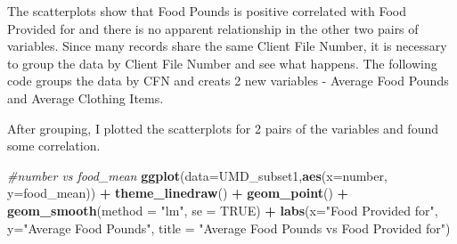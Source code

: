 \documentclass[]{article}
\newenvironment{Shaded}{\begin{snugshade}}{\end{snugshade}}
\newcommand{\CommentTok}[1]{\textcolor[rgb]{0.56,0.35,0.01}{\textit{#1}}}
\newcommand{\DataTypeTok}[1]{\textcolor[rgb]{0.13,0.29,0.53}{#1}}
\newcommand{\KeywordTok}[1]{\textcolor[rgb]{0.13,0.29,0.53}{\textbf{#1}}}
\newcommand{\NormalTok}[1]{#1}
\newcommand{\OperatorTok}[1]{\textcolor[rgb]{0.81,0.36,0.00}{\textbf{#1}}}
\newcommand{\OtherTok}[1]{\textcolor[rgb]{0.56,0.35,0.01}{#1}}
\newcommand{\StringTok}[1]{\textcolor[rgb]{0.31,0.60,0.02}{#1}}
\begin{document}
The scatterplots show that Food Pounds is positive correlated with Food
Provided for and there is no apparent relationship in the other two
pairs of variables. Since many records share the same Client File
Number, it is necessary to group the data by Client File Number and see
what happens. The following code groups the data by CFN and creats 2 new
variables - Average Food Pounds and Average Clothing Items.

\begin{Shaded}
\end{Shaded}

After grouping, I plotted the scatterplots for 2 pairs of the variables
and found some correlation.

\begin{Shaded}
\begin{Highlighting}[]
\CommentTok{#number vs food_mean}
\KeywordTok{ggplot}\NormalTok{(}\DataTypeTok{data=}\NormalTok{UMD_subset1,}\KeywordTok{aes}\NormalTok{(}\DataTypeTok{x=}\NormalTok{number, }\DataTypeTok{y=}\NormalTok{food_mean)) }\OperatorTok{+}
\StringTok{  }\KeywordTok{theme_linedraw}\NormalTok{() }\OperatorTok{+}
\StringTok{  }\KeywordTok{geom_point}\NormalTok{() }\OperatorTok{+}
\StringTok{  }\KeywordTok{geom_smooth}\NormalTok{(}\DataTypeTok{method =} \StringTok{"lm"}\NormalTok{, }\DataTypeTok{se =} \OtherTok{TRUE}\NormalTok{) }\OperatorTok{+}
\StringTok{  }\KeywordTok{labs}\NormalTok{(}\DataTypeTok{x=}\StringTok{"Food Provided for"}\NormalTok{,}
       \DataTypeTok{y=}\StringTok{"Average Food Pounds"}\NormalTok{,}
       \DataTypeTok{title =} \StringTok{"Average Food Pounds vs Food Provided for"}\NormalTok{)}
\end{Highlighting}
\end{Shaded}
\end{document}
